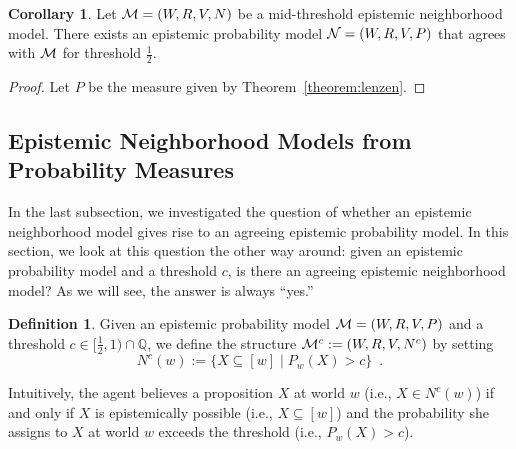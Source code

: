 \documentclass[12pt]{article}
\theoremstyle{definition}
\newtheorem{corollary}[theorem]{Corollary}
\newtheorem{definition}[theorem]{Definition}
\newcommand{\Rat}{\mathbb{Q}}  %
\newcommand{\M}{{\cal M}}      %
\newcommand{\N}{{\cal N}}      %
\begin{document}
\begin{corollary}
  \label{corollary:lenzen}
  Let $\M=(W,R,V,N)$ be a mid-threshold epistemic neighborhood model.
  There exists an epistemic probability model $\N=(W,R,V,P)$ that
  agrees with $\M$ for threshold $\frac 12$.
\end{corollary}
\begin{proof} 
  Let $P$ be the measure given by Theorem~\ref{theorem:lenzen}.
\end{proof}

\subsection{Epistemic Neighborhood Models from Probability Measures}
\label{Section:BeliefBet}

In the last subsection, we investigated the question of whether an
epistemic neighborhood model gives rise to an agreeing epistemic
probability model.  In this section, we look at this question the
other way around: given an epistemic probability model and a threshold
$c$, is there an agreeing epistemic neighborhood model?  As we will
see, the answer is always ``yes.''

\begin{definition}
  Given an epistemic probability model $\M = (W,R,V,P)$ and a
  threshold $c\in[\frac 12,1)\cap\Rat$, we define the structure $\M^c
  := (W,R,V,N^c)$ by setting
  \[
  N^c(w) := \{X\subseteq[w]\mid P_w(X)>c\}\enspace.
  \]
\end{definition}

Intuitively, the agent believes a proposition $X$ at world $w$ (i.e.,
$X\in N^c(w)$) if and only if $X$ is epistemically possible (i.e.,
$X\subseteq[w]$) and the probability she assigns to $X$ at world $w$
exceeds the threshold (i.e., $P_w(X)>c$).
\end{document}
